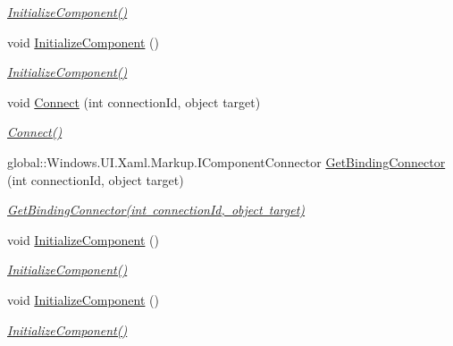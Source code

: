 \begin{DoxyCompactItemize}
\begin{DoxyCompactList}\small\item\em \mbox{\hyperlink{class_r_f_storage_1_1_view_1_1_organisation_1_1_organisation_liste_indlevering_v_a4faf281a2fce600af22aea17b58238e2}{Initialize\+Component()}} \end{DoxyCompactList}\item 
void \mbox{\hyperlink{class_r_f_storage_1_1_view_1_1_organisation_1_1_organisation_liste_indlevering_v_a4faf281a2fce600af22aea17b58238e2}{Initialize\+Component}} ()
\begin{DoxyCompactList}\small\item\em \mbox{\hyperlink{class_r_f_storage_1_1_view_1_1_organisation_1_1_organisation_liste_indlevering_v_a4faf281a2fce600af22aea17b58238e2}{Initialize\+Component()}} \end{DoxyCompactList}\item 
void \mbox{\hyperlink{class_r_f_storage_1_1_view_1_1_organisation_1_1_organisation_liste_indlevering_v_ac4d954f6250768b4512f772b956a6525}{Connect}} (int connection\+Id, object target)
\begin{DoxyCompactList}\small\item\em \mbox{\hyperlink{class_r_f_storage_1_1_view_1_1_organisation_1_1_organisation_liste_indlevering_v_ac4d954f6250768b4512f772b956a6525}{Connect()}} \end{DoxyCompactList}\item 
global\+::\+Windows.\+U\+I.\+Xaml.\+Markup.\+I\+Component\+Connector \mbox{\hyperlink{class_r_f_storage_1_1_view_1_1_organisation_1_1_organisation_liste_indlevering_v_aa490d82055f8158eeaac5ae55e04f6ba}{Get\+Binding\+Connector}} (int connection\+Id, object target)
\begin{DoxyCompactList}\small\item\em \mbox{\hyperlink{class_r_f_storage_1_1_view_1_1_organisation_1_1_organisation_liste_indlevering_v_aa490d82055f8158eeaac5ae55e04f6ba}{Get\+Binding\+Connector(int connection\+Id, object target)}} \end{DoxyCompactList}\item 
void \mbox{\hyperlink{class_r_f_storage_1_1_view_1_1_organisation_1_1_organisation_liste_indlevering_v_a4faf281a2fce600af22aea17b58238e2}{Initialize\+Component}} ()
\begin{DoxyCompactList}\small\item\em \mbox{\hyperlink{class_r_f_storage_1_1_view_1_1_organisation_1_1_organisation_liste_indlevering_v_a4faf281a2fce600af22aea17b58238e2}{Initialize\+Component()}} \end{DoxyCompactList}\item 
void \mbox{\hyperlink{class_r_f_storage_1_1_view_1_1_organisation_1_1_organisation_liste_indlevering_v_a4faf281a2fce600af22aea17b58238e2}{Initialize\+Component}} ()
\begin{DoxyCompactList}\small\item\em \mbox{\hyperlink{class_r_f_storage_1_1_view_1_1_organisation_1_1_organisation_liste_indlevering_v_a4faf281a2fce600af22aea17b58238e2}{Initialize\+Component()}} \end{DoxyCompactList}\end{DoxyCompactItemize}


